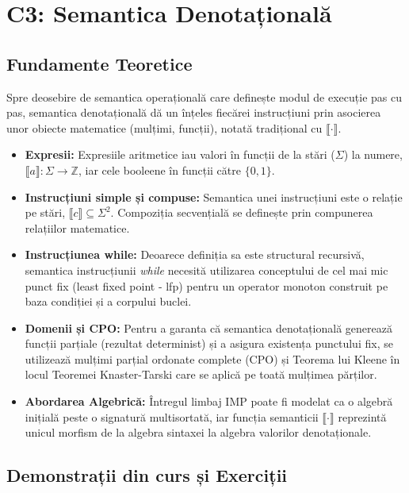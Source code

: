 \section*{C3: Semantica Denotațională}

\subsection{Fundamente Teoretice}

Spre deosebire de semantica operațională care definește modul de execuție pas cu pas, semantica denotațională dă un înțeles fiecărei instrucțiuni prin asocierea unor obiecte matematice (mulțimi, funcții), notată tradițional cu $\llbracket \cdot \rrbracket$.
\begin{itemize}
	\item \textbf{Expresii:} Expresiile aritmetice iau valori în funcții de la stări ($\Sigma$) la numere, $\llbracket a \rrbracket : \Sigma \to \mathbb{Z}$, iar cele booleene în funcții către $\{0,1\}$.
	\item \textbf{Instrucțiuni simple și compuse:} Semantica unei instrucțiuni este o relație pe stări, $\llbracket c \rrbracket \subseteq \Sigma^2$. Compoziția secvențială se definește prin compunerea relațiilor matematice.
	\item \textbf{Instrucțiunea while:} Deoarece definiția sa este structural recursivă, semantica instrucțiunii \textit{while} necesită utilizarea conceptului de cel mai mic punct fix (least fixed point - lfp) pentru un operator monoton construit pe baza condiției și a corpului buclei.
	\item \textbf{Domenii și CPO:} Pentru a garanta că semantica denotațională generează funcții parțiale (rezultat determinist) și a asigura existența punctului fix, se utilizează mulțimi parțial ordonate complete (CPO) și Teorema lui Kleene în locul Teoremei Knaster-Tarski care se aplică pe toată mulțimea părților.
	\item \textbf{Abordarea Algebrică:} Întregul limbaj IMP poate fi modelat ca o algebră inițială peste o signatură multisortată, iar funcția semanticii $\llbracket \cdot \rrbracket$ reprezintă unicul morfism de la algebra sintaxei la algebra valorilor denotaționale.
\end{itemize}

\subsection{Demonstrații din curs și Exerciții}

